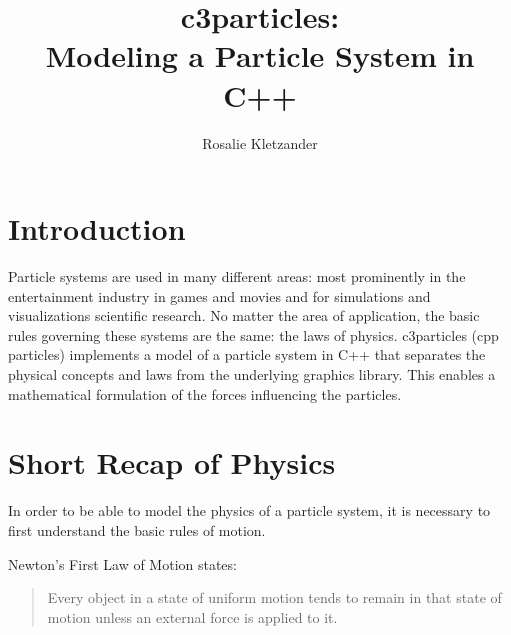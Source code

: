 \documentclass[runningheads,a4paper]{llncs}
\begin{document}
\mainmatter  %

\title{c3particles: \\ Modeling a Particle System in C++}


%
\author{Rosalie Kletzander}
%


\maketitle


%
%

\section{Introduction}
Particle systems are used in many different areas: most prominently in the entertainment industry in games and movies and for simulations and visualizations scientific research. No matter the area of application, the basic rules governing these systems are the same: the laws of physics. c3particles (cpp particles) implements a model of a particle system in C++ that separates the physical concepts and laws from the underlying graphics library. This enables a mathematical formulation of the forces influencing the particles.


\section{Short Recap of Physics}

In order to be able to model the physics of a particle system, it is necessary to first understand the basic rules of motion.

Newton's First Law of Motion states:
\begin{quotation}
Every object in a state of uniform motion tends to remain in that state of motion unless an external force is applied to it.
\end{quotation}
\end{document}
